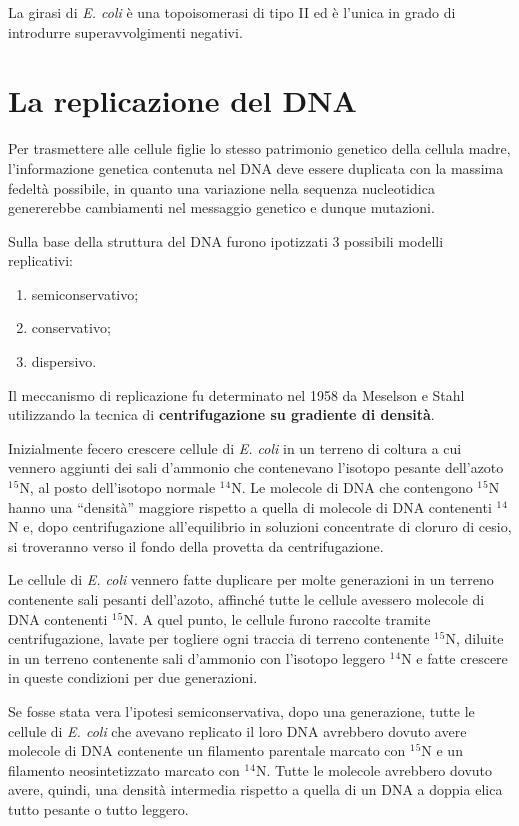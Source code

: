 \documentclass[11pt]{book}
\begin{document}
La girasi di \emph{E. coli} è una topoisomerasi di tipo II ed è l'unica
in grado di introdurre superavvolgimenti negativi.

\chapter{La replicazione del DNA}\label{la-replicazione-del-dna}

Per trasmettere alle cellule figlie lo stesso patrimonio genetico della
cellula madre, l'informazione genetica contenuta nel DNA deve essere
duplicata con la massima fedeltà possibile, in quanto una variazione
nella sequenza nucleotidica genererebbe cambiamenti nel messaggio
genetico e dunque mutazioni.

Sulla base della struttura del DNA furono ipotizzati 3 possibili modelli
replicativi:

\begin{enumerate}
\def\labelenumi{\arabic{enumi}.}
\itemsep1pt\parskip0pt
\item
  semiconservativo;
\item
  conservativo;
\item
  dispersivo.
\end{enumerate}

Il meccanismo di replicazione fu determinato nel 1958 da Meselson e
Stahl utilizzando la tecnica di \textbf{centrifugazione su gradiente di
densità}.

Inizialmente fecero crescere cellule di \emph{E. coli} in un terreno di
coltura a cui vennero aggiunti dei sali d'ammonio che contenevano
l'isotopo pesante dell'azoto \(^1\)\(^5\)N, al posto dell'isotopo
normale \(^1\)\(^4\)N. Le molecole di DNA che contengono \(^1\)\(^5\)N
hanno una ``densità'' maggiore rispetto a quella di molecole di DNA
contenenti \(^1\)\(^4\)N e, dopo centrifugazione all'equilibrio in
soluzioni concentrate di cloruro di cesio, si troveranno verso il fondo
della provetta da centrifugazione.

Le cellule di \emph{E. coli} vennero fatte duplicare per molte
generazioni in un terreno contenente sali pesanti dell'azoto, affinché
tutte le cellule avessero molecole di DNA contenenti \(^1\)\(^5\)N. A
quel punto, le cellule furono raccolte tramite centrifugazione, lavate
per togliere ogni traccia di terreno contenente \(^1\)\(^5\)N, diluite
in un terreno contenente sali d'ammonio con l'isotopo leggero
\(^1\)\(^4\)N e fatte crescere in queste condizioni per due generazioni.

Se fosse stata vera l'ipotesi semiconservativa, dopo una generazione,
tutte le cellule di \emph{E. coli} che avevano replicato il loro DNA
avrebbero dovuto avere molecole di DNA contenente un filamento parentale
marcato con \(^1\)\(^5\)N e un filamento neosintetizzato marcato con
\(^1\)\(^4\)N. Tutte le molecole avrebbero dovuto avere, quindi, una
densità intermedia rispetto a quella di un DNA a doppia elica tutto
pesante o tutto leggero.
\end{document}
